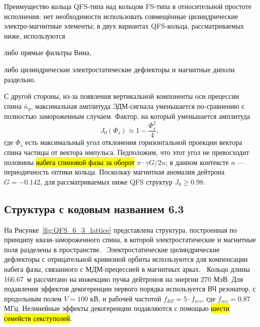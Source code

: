 Преимущество кольца QFS-типа над кольцом FS-типа в относительной простоте исполнения: нет необходимости использовать совмещённые цилиндрические электро-магнитные элементы; в двух вариантах QFS-кольца, рассматриваемых ниже, используются 
\begin{enumerate*}
\item либо прямые фильтры Вина, 
\item либо цилиндрические электростатические дефлекторы и магнитные диполи раздельно.
\end{enumerate*}
С другой стороны, из-за появления вертикальной компоненты оси прецессии спина $\bar n_y$, максимальная амплитуда ЭДМ-сигнала уменьшается по-сравнению с полностью замороженным случаем. Фактор, на который уменьшается амплитуда~\cite{Senichev:QFS_IPAC15}
\[
J_0(\Phi_s) \approx 1 - \frac{\Phi_s^2}{4},
\]
где $\Phi_s$ есть максимальный угол отклонения горизонтальной проекции вектора спина частицы от вектора импульса. Педположим, что этот угол не превосходит половины \hl{набега спиновой фазы за оборот} $\pi\cdot \gamma G/2n$; в данном контексте $n$ --- периодичность оптики кольца. Поскольку магнитная аномалия дейтрона $G = -0.142$, для рассматриваемых ниже QFS структур $J_0\ge 0.98$.

\subsection{Структура с кодовым названием 6.3}\label{chpt2:lattice:QFS:6_3}

На Рисунке~\ref{fig:QFS_6_3_lattice} представлена структура, построенная по принципу квази-замороженного спина, в которой электростатические и магнитные поля разделены в пространстве.~\cite{Senichev:Lattices} Электростатические цилиндрические дефлекторы с отрицательной кривизной орбиты используются для компенсации набега фазы, связанного с МДМ-прецессией в магнитных арках.~\cite{Senichev:QFS_IPAC15} Кольцо длины 166.67~м рассчитано на инжекцию пучка дейтронов на энергии 270 МэВ. Для подавления эффектов декогеренции первого порядка используется ВЧ резонатор, с продольным полем $V = 100$ кВ, и рабочей частотой $f_{RF} = 5\cdot f_{rev}$, где $f_{rev} = 0.87$ МГц. Нелинейные эффекты декогеренции подавляются с помощью \hl{шести семейств секступолей}.

